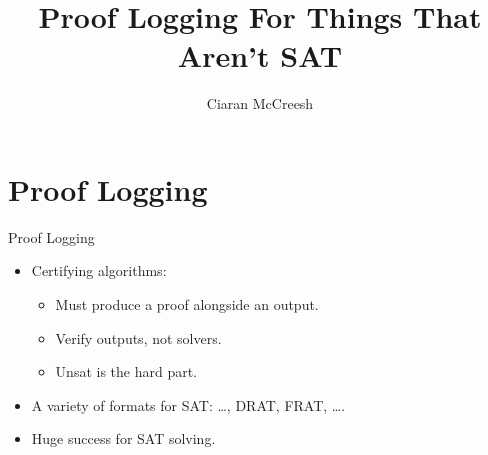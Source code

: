 \documentclass{beamer}
\author{Ciaran McCreesh}
\title{Proof Logging For Things That Aren't SAT}
\begin{document}
{
    \begin{frame}
        \titlepage
    \end{frame}
}

\section{Proof Logging}

\begin{frame}{Proof Logging}
    \begin{itemize}
        \item Certifying algorithms:
            \begin{itemize}
                \item Must produce a proof alongside an output.
                \item Verify outputs, not solvers.
                \item Unsat is the hard part.
            \end{itemize}
        \item A variety of formats for SAT: \ldots, DRAT, FRAT, \ldots.
        \item Huge success for SAT solving.
    \end{itemize}
\end{frame}
\end{document}
